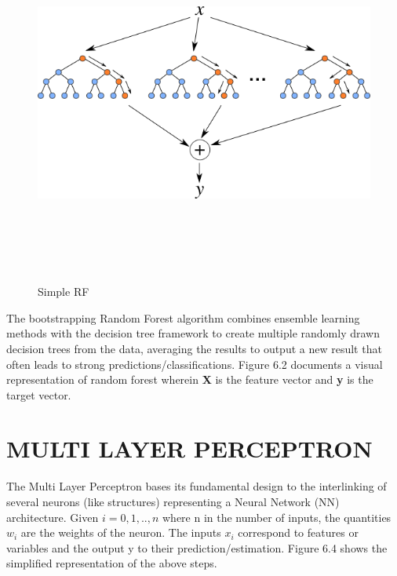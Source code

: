 \begin{figure}[h]
\centering
\includegraphics[width=1\textwidth, height=12cm]{./figures/rf.png}
\caption{Simple RF}
\label{fig1}
\end{figure}

The bootstrapping Random Forest algorithm \cite{B} combines ensemble learning methods with the decision tree framework to create multiple randomly drawn decision trees from the data, averaging the results to output a new result that often leads to strong predictions/classifications. Figure 6.2 documents a visual representation of random forest wherein \textbf{X} is the feature vector and \textbf{y} is the target vector. 

\section{MULTI LAYER PERCEPTRON}

The Multi Layer Perceptron bases its fundamental design to the interlinking of several neurons (like structures) representing a Neural Network (NN) architecture. Given $i = 0,1,..,n$ where n in the number of inputs, the quantities $w_{i}$ are the weights of the neuron. The inputs $x_{i}$ correspond to features or variables and the output y to their prediction/estimation. Figure 6.4 shows the simplified representation of the above steps.  

